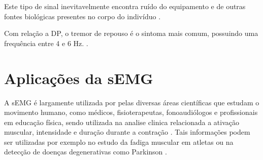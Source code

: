 Este tipo de sinal inevitavelmente encontra ruído do equipamento e de outras fontes biológicas presentes no corpo do indivíduo \cite{yousefi2014characterizing}.

Com relação a DP, o tremor de repouso é o sintoma mais comum, possuindo uma frequência entre 4 e 6 Hz.
\cite{jankovic2008parkinson}.

\section{Aplicações da sEMG}
A sEMG é largamente utilizada por pelas diversas áreas científicas que estudam o movimento humano, como médicos, fisioterapeutas, fonoaudiólogos e profissionais em educação física, sendo utilizada na analise clinica relacionada a ativação muscular, intensidade e duração durante a contração \cite{nascimento2012surface}. Tais informações podem ser utilizadas por exemplo no estudo da fadiga muscular em atletas \cite{schmitz2012unchanged} ou na detecção de doenças degenerativas como Parkinson \cite{eftaxias2015detection}.